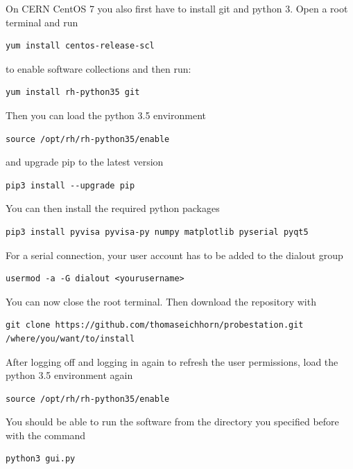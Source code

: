 \documentclass[a4paper]{article}
\begin{document}
On CERN CentOS 7 you also first have to install git and python 3. Open a root terminal and run

\begin{lstlisting}
yum install centos-release-scl
\end{lstlisting}

to enable software collections and then run:

\begin{lstlisting}
yum install rh-python35 git
\end{lstlisting}

Then you can load the python 3.5 environment

\begin{lstlisting}
source /opt/rh/rh-python35/enable
\end{lstlisting}

and upgrade pip to the latest version

\begin{lstlisting}
pip3 install --upgrade pip
\end{lstlisting}

You can then install the required python packages

\begin{lstlisting}
pip3 install pyvisa pyvisa-py numpy matplotlib pyserial pyqt5
\end{lstlisting}

For a serial connection, your user account has to be added to the dialout group

\begin{lstlisting}
usermod -a -G dialout <yourusername>
\end{lstlisting}

You can now close the root terminal. Then download the repository with

\begin{lstlisting}
git clone https://github.com/thomaseichhorn/probestation.git /where/you/want/to/install
\end{lstlisting}

After logging off and logging in again to refresh the user permissions, load the python 3.5 environment again

\begin{lstlisting}
source /opt/rh/rh-python35/enable
\end{lstlisting}

You should be able to run the software from the directory you specified before with the command

\begin{lstlisting}
python3 gui.py
\end{lstlisting}
\end{document}
